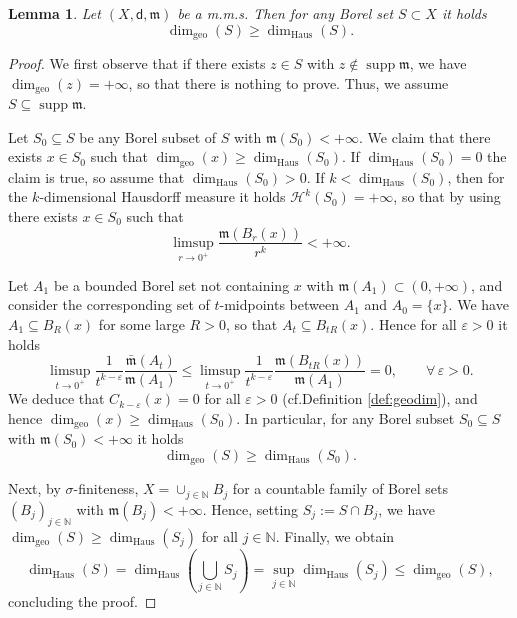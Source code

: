 \documentclass[11pt,a4paper]{article}
\theoremstyle{plain}
\newtheorem{lemma}[theorem]{Lemma}
\theoremstyle{definition}
\theoremstyle{remark}
\numberwithin{equation}{section}
\newcommand{\N}{\mathbb{N}} %
\DeclareMathOperator{\supp}{\mathrm{supp}}
\newcommand{\mm}{\mathfrak m}
\newcommand{\sfd}{\mathsf d}
\newcommand{\NN}{\dim_{\mathrm{geo}}}
\newcommand{\NH}{\dim_{\mathrm{Haus}}}
\begin{document}
\begin{lemma}\label{l:geodgedhaus}
Let $(X,\sfd,\mm)$ be a m.m.s. Then for any Borel set $S\subset X$ it holds
\begin{equation}
\NN(S) \geq \NH(S).
\end{equation}
\end{lemma}
\begin{proof}

We first observe that if there exists $z\in S$ with $z\notin\supp\mm$, we have $\NN(z) = +\infty$, so that there is nothing to prove. Thus, we assume $S\subseteq \supp\mm$. 

Let $S_0\subseteq S$ be any Borel subset of $S$ with $\mm(S_0)<+\infty$. We claim that there exists $x\in S_0$ such that $\NN(x)\geq \NH(S_0)$. If $\NH(S_0)=0$ the claim is true, so assume that $\NH(S_0)>0$. If $k < \NH(S_0)$, then for the $k$-dimensional Hausdorff measure it holds $\mathcal{H}^k(S_0) = +\infty$, so that by using \cite[Thm.\@ 2.4.3]{AT-measure} there exists $x\in S_0$ such that
\begin{equation}
\limsup_{r\to 0^+} \frac{\mm(B_r(x))}{r^k}<+\infty.
\end{equation}

Let $A_1$ be a bounded Borel set  not containing $x$ with $\mm(A_1)\subset (0,+\infty)$, and consider the corresponding set of $t$-midpoints between $A_1$ and $A_0 = \{x\}$. We have $A_1\subseteq B_R(x)$ for some large $R>0$, so that $A_t \subseteq B_{tR}(x)$. Hence for all $\varepsilon>0$ it holds
\begin{equation}
\limsup_{t\to 0^+} \frac{1}{t^{k-\varepsilon}}\frac{\bar{\mm}(A_t)}{\mm(A_1)} \leq \limsup_{t\to 0^+} \frac{1}{t^{k-\varepsilon}}\frac{\mm(B_{tR}(x))}{\mm(A_1)} =0, \qquad \forall\,\varepsilon>0.
\end{equation}
We deduce that $C_{k-\varepsilon}(x) =0$ for all $\varepsilon>0$ (cf.\@ Definition \ref{def:geodim}), and hence $\NN(x) \geq \NH(S_0)$. In particular, for any Borel subset $S_0\subseteq S$ with $\mm(S_0)<+\infty$ it holds
\begin{equation}
\NN(S) \geq \NH(S_0).
\end{equation}

Next, by $\sigma$-finiteness, $X=\cup_{j\in \N} B_j$ for a countable family of Borel sets $(B_j)_{j\in \N}$ with $\mm(B_j)<+\infty$. Hence, setting $S_j:=S\cap B_j$, we have $\NN(S)\geq \NH(S_j)$ for all $j\in \N$. Finally, we obtain
\begin{equation}
\NH(S) = \NH\left(\bigcup_{j\in \N}S_j\right)  = \sup_{j\in\N} \NH(S_j) \leq \NN(S),
\end{equation}
concluding the proof.
\end{proof}
\end{document}
